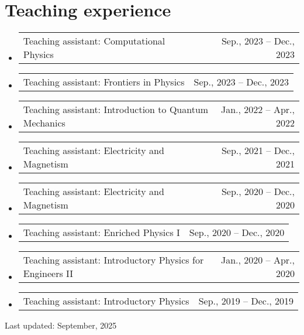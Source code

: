 \documentclass[letterpaper,11pt]{article}
\makeatletter
\newcommand{\TeachingItem}[2]{
	\item{\vspace{-1pt}
		\begin{tabular*}{0.92\textwidth}{l@{\extracolsep{\fill}}r}
			{#1} & {#2}
		\end{tabular*}
		\vspace{-5pt}
	}
}
\newcommand{\SkillsItem}[2]{
	\item{\vspace{-1pt}
		\begin{tabular*}{0.97\textwidth}{l l}
			{#1:} & {#2}
		\end{tabular*}
		\vspace{-5pt}
	}
}
\makeatother
\begin{document}

\section*{Teaching experience}
\begin{itemize}[leftmargin=*]
	\TeachingItem{Teaching assistant: Computational Physics}{Sep., 2023 -- Dec., 2023}
	\TeachingItem{Teaching assistant: Frontiers in Physics}{Sep., 2023 -- Dec., 2023}
	\TeachingItem{Teaching assistant: Introduction to Quantum Mechanics}{Jan., 2022 -- Apr., 2022}
	\TeachingItem{Teaching assistant: Electricity and Magnetism}{Sep., 2021 -- Dec., 2021}
	\TeachingItem{Teaching assistant: Electricity and Magnetism}{Sep., 2020 -- Dec., 2020}
	\TeachingItem{Teaching assistant: Enriched Physics I}{Sep., 2020 -- Dec., 2020}
	\TeachingItem{Teaching assistant: Introductory Physics for Engineers II}{Jan., 2020 -- Apr., 2020}
	\TeachingItem{Teaching assistant: Introductory Physics}{Sep., 2019 -- Dec., 2019}
\end{itemize}

\vspace{1cm}

\begin{flushright}
	Last updated: September, 2025
\end{flushright}
\end{document}
